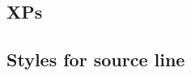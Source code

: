 \documentclass[output=book
  ,nonflat
  ,modfonts,
  ,colorlinks
  ,undecapitalize 
  ,collection
  ,showindex
  ,draftmode
  ,openreview
  ,nobabel
  ,booklanguage=french
  ,oldstylenumbers
  ]{langsci/langscibook}
\begin{document}
\subsection{XPs}


  

\subsection{Styles for source line}




% 
% 
% 
% 
% 
% 
% 
%  
%  
% 
% 
% 
% 
% 
% 
% 
% 
% 
\end{document}

